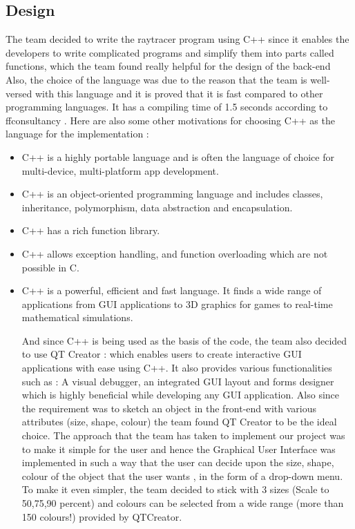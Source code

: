 \documentclass{article}
\begin{document}
\subsection{Design}

The team decided to write the raytracer program using C++ since it enables the developers to write complicated programs and simplify them into parts called functions, which the team found really helpful for the design of the back-end Also, the choice of the language was due to the reason that the team is well-versed with this language and it is proved that it is fast compared to other programming languages. It has a compiling time of 1.5 seconds according to ffconsultancy \cite{3}. Here are also some other motivations for choosing C++ as the language for the implementation \cite{12}: 
\begin{itemize}
    \item 
	C++ is a highly portable language and is often the language of choice for multi-device, multi-platform app development.
\item	C++ is an object-oriented programming language and includes classes, inheritance, polymorphism, data abstraction and encapsulation.
\item	C++ has a rich function library.
\item	C++ allows exception handling, and function overloading which are not possible in C.
\item	C++ is a powerful, efficient and fast language. It finds a wide range of applications { from GUI applications to 3D graphics for games to real-time
mathematical simulations}.


And since C++ is being used as the basis of the code, the team also decided to use QT Creator : which enables users to create interactive GUI applications with ease using C++. It also provides various functionalities such as : A visual debugger, an integrated GUI layout and forms designer which is highly beneficial while developing any GUI application. Also since the requirement was to sketch an object in the front-end with various attributes (size, shape, colour) the team found QT Creator to be the ideal choice. 
The approach that the team has taken to implement our project was to make it simple for the user and hence the Graphical User Interface was implemented in such a way that the user can decide upon the size, shape, colour of the object that the user wants , in the form of a drop-down menu. To make it even simpler, the team decided to stick with 3 sizes (Scale to 50,75,90 percent) and colours can be selected from a wide range (more than 150 colours!) provided by QTCreator.


\end{itemize}
\end{document}

